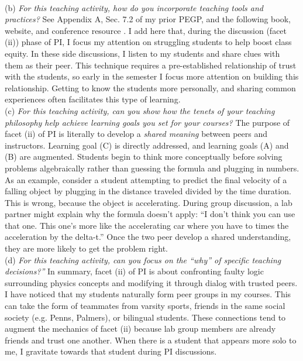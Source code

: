 \documentclass[../../../main.tex]{subfiles}
\begin{document}
\\
\vspace{0.25cm}
(b) \textit{For this teaching activity, how do you incorporate teaching tools and practices?}  See Appendix A, Sec. 7.2 of my prior PEGP, and the following book, website, and conference resource \cite{mazur2013peer,PhysPort,AAPTPI}.  I add here that, during the discussion (facet (ii)) phase of PI, I focus my attention on struggling students to help boost class equity.  In these side discussions, I listen to my students and share clues with them as their peer.  This technique requires a pre-established relationship of trust with the students, so early in the semester I focus more attention on building this relationship.  Getting to know the students more personally, and sharing common experiences often facilitates this type of learning.
\\
\vspace{0.25cm}
(c) \textit{For this teaching activity, can you show how the tenets of your teaching philosophy help achieve learning goals you set for your courses?}  The purpose of facet (ii) of PI is literally to develop a \textit{shared meaning} between peers and instructors.  Learning goal (C) is directly addressed, and learning goals (A) and (B) are augmented.  Students begin to think more conceptually before solving problems algebraically rather than guessing the formula and plugging in numbers.  As an example, consider a student attempting to predict the final velocity of a falling object by plugging in the distance traveled divided by the time duration.  This is wrong, because the object is accelerating.  During group discussion, a lab partner might explain why the formula doesn't apply:  ``I don't think you can use that one. This one's more like the accelerating car where you have to times the acceleration by the delta-t.''  Once the two peer develop a shared understanding, they are more likely to get the problem right. 
\\
\vspace{0.25cm}
(d) \textit{For this teaching activity, can you focus on the ``why'' of specific teaching decisions?''} In summary, facet (ii) of PI is about confronting faulty logic surrounding physics concepts and modifying it through dialog with trusted peers.  I have noticed that my students naturally form peer groups in my courses.  This can take the form of teammates from varsity sports, friends in the same social society (e.g. Penns, Palmers), or bilingual students.  These connections tend to augment the mechanics of facet (ii) because lab group members are already friends and trust one another.  When there is a student that appears more solo to me, I gravitate towards that student during PI discussions.
\end{document}
